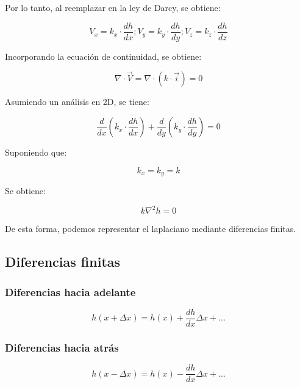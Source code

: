 Por lo tanto, al reemplazar en la ley de Darcy, se obtiene:

\begin{equation}
    V_x = k_x\cdot \frac{dh}{dx}; V_y = k_y\cdot \frac{dh}{dy}; V_z = k_z\cdot \frac{dh}{dz}
\end{equation}

Incorporando la ecuación de continuidad, se obtiene:

\begin{equation}
    \nabla \cdot \vec{V} = \nabla \cdot (k \cdot \vec{i}) = 0
\end{equation}

Asumiendo un análisis en 2D, se tiene:

\begin{equation}
    \frac{d}{dx}(k_x \cdot \frac{dh}{dx}) + \frac{d}{dy}(k_y \cdot \frac{dh}{dy}) = 0
\end{equation}

Suponiendo que:

\begin{equation}
    k_x = k_y = k
\end{equation}

Se obtiene:

\begin{equation}
    k \nabla^2 h = 0
\end{equation}

De esta forma, podemos representar el laplaciano mediante diferencias finitas. \cite{budhu_soil_2010}

\subsection{Diferencias finitas}

\subsubsection{Diferencias hacia adelante}

\begin{equation}
    h(x + \Delta x) = h(x) + \frac{dh}{dx} \Delta x + ...
\end{equation}

\subsubsection{Diferencias hacia atrás}

\begin{equation}
    h(x - \Delta x) = h(x) - \frac{dh}{dx} \Delta x + ...
\end{equation}

